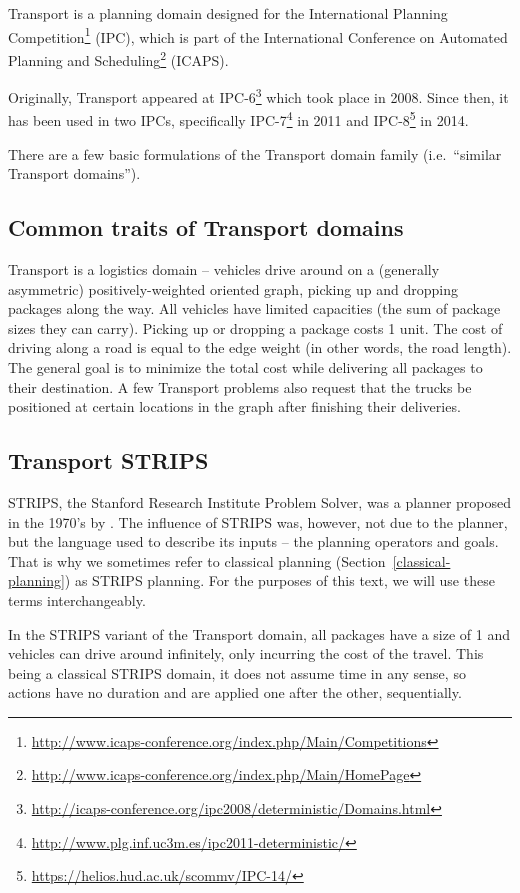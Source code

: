 Transport is a planning domain designed for
the International Planning
Competition\footnote{\url{http://www.icaps-conference.org/index.php/Main/Competitions}}
(IPC), which is part of the International Conference on Automated Planning and
Scheduling\footnote{\url{http://www.icaps-conference.org/index.php/Main/HomePage}} (ICAPS).

Originally, Transport appeared at 
IPC-6\footnote{\url{http://icaps-conference.org/ipc2008/deterministic/Domains.html}} which took place in 2008.
Since then, it has been used in two IPCs,
specifically IPC-7\footnote{\url{http://www.plg.inf.uc3m.es/ipc2011-deterministic/}} in 2011
and IPC-8\footnote{\url{https://helios.hud.ac.uk/scommv/IPC-14/}} in 2014.

There are a few basic formulations of the Transport domain family (i.e.~``similar Transport domains'').

\subsection{Common traits of Transport domains}

Transport is a logistics domain -- vehicles drive around on a (generally asymmetric) positively-weighted oriented graph, picking up and dropping packages along the way.
All vehicles have limited capacities (the sum of package sizes they can carry).
Picking up or dropping a package costs 1 unit. The cost of driving along a road is equal to the edge weight
(in other words, the road length).
The general goal is to minimize the total cost
while delivering all packages to their destination. A few Transport problems
also request that the trucks be positioned at certain locations in the graph
after finishing their deliveries.

\subsection{Transport STRIPS}\label{transport-strips}

STRIPS, the Stanford Research Institute Problem Solver,
was a planner proposed in the 1970's by \citet{Fikes1971}.
The influence of STRIPS was, however, not due to the planner,
but the language used to describe its inputs -- the planning operators and goals.
That is why we sometimes refer to classical planning (Section~\ref{classical-planning})
as STRIPS planning. For the purposes of this text, we will use these terms interchangeably.

In the STRIPS variant of the Transport domain,
all packages have a size of 1 and vehicles can drive around infinitely,
only incurring the cost of the travel. This being a classical STRIPS domain,
it does not assume time in any sense,
so actions have no duration and are applied one after the other, sequentially.

